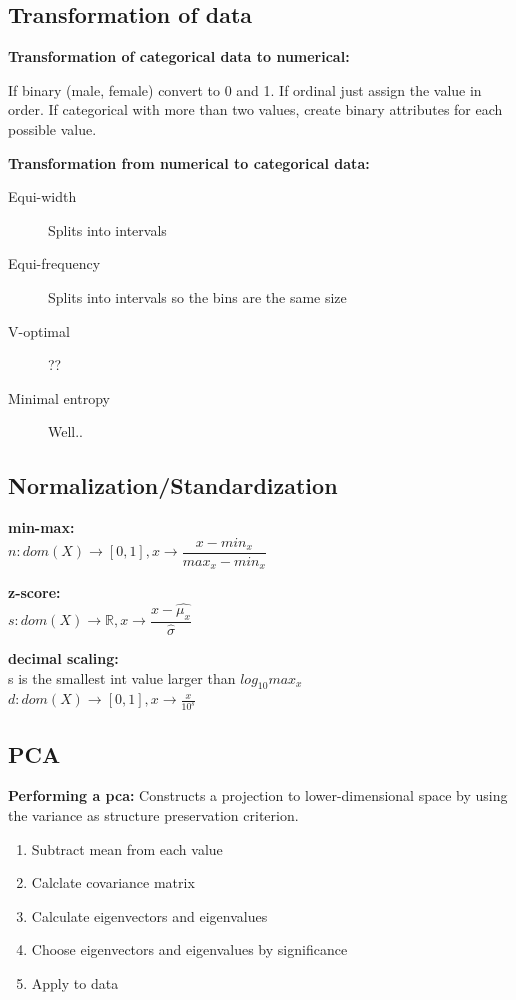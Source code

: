 \documentclass[fleqn, oneside, 10pt, titlepage]{article}
\begin{document}
\subsection{Transformation of data}
\textbf{Transformation of categorical data to numerical:}

If binary (male, female) convert to 0 and 1. If ordinal just assign the value in order. If categorical with more than two values, create binary attributes for each possible value.

\textbf{Transformation from numerical to categorical data:}
\begin{description}
	\item[Equi-width] Splits into intervals
	\item[Equi-frequency] Splits into intervals so the bins are the same size
	\item[V-optimal] ??
	\item[Minimal entropy] Well..
\end{description}

\subsection{Normalization/Standardization}
\textbf{min-max:}\\
$n: dom(X) \rightarrow [0,1], x \rightarrow \dfrac{x - min_x}{max_x - min_x}$

\textbf{z-score:}\\ $s: dom(X) \rightarrow \mathbb{R}, x \rightarrow \dfrac{x- \hat{\mu_x}}{\hat{\sigma}}$

\textbf{decimal scaling:}\\
s is the smallest int value larger than $log_{10} max_x$\\
$d: dom(X) \rightarrow [0,1], x \rightarrow \frac{x}{10^s}$

\subsection{PCA}
\textbf{Performing a pca:}
Constructs a projection to lower-dimensional space by using the variance as structure preservation criterion.

\begin{enumerate}
	\item Subtract mean from each value
	\item Calclate covariance matrix
	\item Calculate eigenvectors and eigenvalues
	\item Choose eigenvectors and eigenvalues by significance
	\item Apply to data
\end{enumerate}
\end{document}

